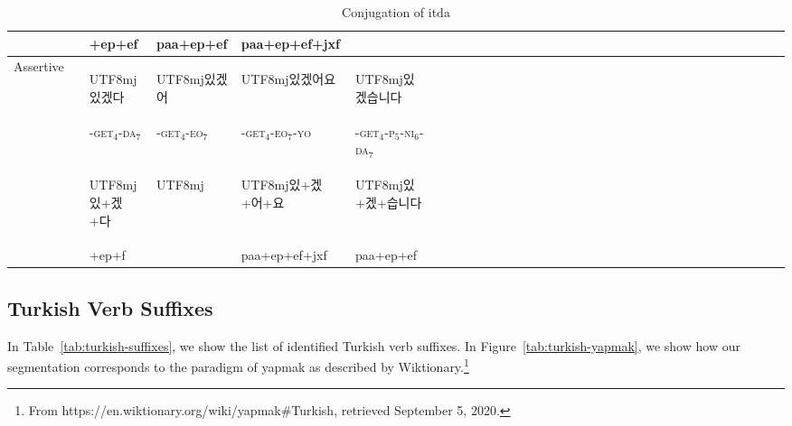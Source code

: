 \documentclass[11pt,letterpaper]{article}
\newcommand{\korean}[1]{\begin{CJK}{UTF8}{mj}#1\end{CJK}}
\begin{document}
\begin{table}[]
\begin{tabular}{llllllllllllllllllllllllllllllllll}
         &  & +ep+ef & paa+ep+ef &  paa+ep+ef+jxf\\
         \hline
\multirow{3}{*}{Assertive} &  & \korean{있겠다} & \korean{있겠어} & \korean{있겠어요} & \korean{있겠습니다} \\
&& -\textsc{get}$_4$-\textsc{da}$_7$ & -\textsc{get}$_4$-\textsc{eo}$_7$ & -\textsc{get}$_4$-\textsc{eo}$_7$-\textsc{yo} & -\textsc{get}$_4$-\textsc{p}$_5$-\textsc{ni}$_6$-\textsc{da}$_7$ \\
         &  & \korean{있+겠+다} & \korean{} & \korean{있+겠+어+요} & \korean{있+겠+습니다}\\
         &  & +ep+f             &           & paa+ep+ef+jxf & paa+ep+ef\\
    \end{tabular}
    \caption{Conjugation of itda}
    \label{tab:kroean-itda}
\end{table}





\subsection{Turkish Verb Suffixes}

In Table~\ref{tab:turkish-suffixes}, we show the list of identified Turkish verb suffixes.
In Figure~\ref{tab:turkish-yapmak}, we show how our segmentation corresponds to the paradigm of yapmak as described by Wiktionary.\footnote{From https://en.wiktionary.org/wiki/yapmak\#Turkish, retrieved September 5, 2020.}
\end{document}
